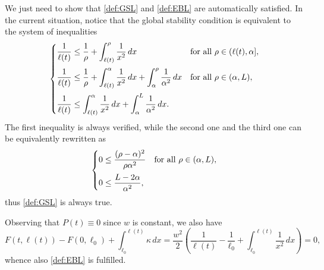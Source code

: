\documentclass[a4paper,11pt,reqno]{amsart}
\numberwithin{equation}{section}
\theoremstyle{definition}
\theoremstyle{remark}
\begin{document}
    We just need to show that \ref{def:GSL} and \ref{def:EBL} are automatically satisfied. In the current situation, notice that the global stability condition is equivalent to the system of inequalities
    \begin{equation}
        \begin{cases}\displaystyle
            \frac{1}{\ell(t)}\le \frac{1}{\rho}+\int_{\ell(t)}^\rho \frac{1}{x^2}\, dx &\text{for all }\rho\in (\ell(t),\alpha],\vspace{2mm}\\\displaystyle
            \frac{1}{\ell(t)}\le \frac{1}{\rho}+\int_{\ell(t)}^\alpha \frac{1}{x^2}\, dx+\int_{\alpha}^\rho \frac{1}{\alpha^2}\, dx&\text{for all }\rho\in (\alpha,L),\vspace{2mm}\\\displaystyle
            \frac{1}{\ell(t)}\le\int_{\ell(t)}^\alpha \frac{1}{x^2}\, dx+\int_{\alpha}^L \frac{1}{\alpha^2}\, dx.
        \end{cases}
    \end{equation}
    The first inequality is always verified, while the second one and the third one can be equivalently rewritten as
    \begin{equation}
         \begin{cases}\displaystyle
         0\le \frac{(\rho-\alpha)^2}{\rho\alpha^2}& \text{for all }\rho\in (\alpha,L),\vspace{2mm}\\\displaystyle
         0\le \frac{L-2\alpha}{\alpha^2},
         \end{cases}
    \end{equation}
    thus \ref{def:GSL} is always true.

    Observing that $P(t)\equiv 0$ since $w$ is constant, we also have
    \begin{equation}
        F(t,\ell(t))-F(0,\ell_0) +\int_{\ell_0}^{\ell(t)}\kappa\, dx= \frac{w^2}{2}\left(\frac{1}{\ell(t)}-\frac{1}{\ell_0}+\int_{\ell_0}^{\ell(t)}\frac{1}{x^2}\, dx\right)=0,
    \end{equation}
    whence also \ref{def:EBL} is fulfilled.
\end{document}
